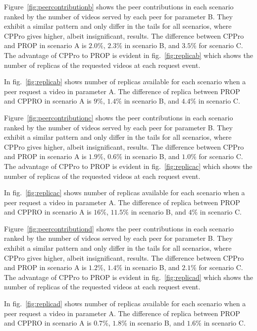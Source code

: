 \documentclass[10pt,final,journal,a4paper]{IEEEtran}
\begin{document}
Figure~\ref{fig:peercontributionb} shows the peer contributions in each scenario ranked by the number of videos served by each peer for parameter B.
They exhibit a similar pattern and only differ in the tails for all scenarios, where CPPro gives higher, albeit insignificant, results.
The difference between CPPro and PROP in scenario A is $2.0\%$, $2.3\%$ in scenario B, and $3.5\%$ for scenario C.
The advantage of CPPro to PROP is evident in fig.~\ref{fig:replicab} which shows the number of replicas of the requested videos at each request event.

In fig.~\ref{fig:replicab} shows number of replicas available for each scenario when a peer request a video in parameter A.
The difference of replica between PROP and CPPRO in scenario A is $9\%$, $1.4\%$ in scenario B, and $4.4\%$ in scenario C.

Figure~\ref{fig:peercontributionc} shows the peer contributions in each scenario ranked by the number of videos served by each peer for parameter B.
They exhibit a similar pattern and only differ in the tails for all scenarios, where CPPro gives higher, albeit insignificant, results.
The difference between CPPro and PROP in scenario A is $1.9\%$, $0.6\%$ in scenario B, and $1.0\%$ for scenario C.
The advantage of CPPro to PROP is evident in fig.~\ref{fig:replicac} which shows the number of replicas of the requested videos at each request event.

In fig.~\ref{fig:replicac} shows number of replicas available for each scenario when a peer request a video in parameter A.
The difference of replica between PROP and CPPRO in scenario A is $16\%$, $11.5\%$ in scenario B, and $4\%$ in scenario C.


Figure~\ref{fig:peercontributiond} shows the peer contributions in each scenario ranked by the number of videos served by each peer for parameter B.
They exhibit a similar pattern and only differ in the tails for all scenarios, where CPPro gives higher, albeit insignificant, results.
The difference between CPPro and PROP in scenario A is $1.2\%$, $1.4\%$ in scenario B, and $2.1\%$ for scenario C.
The advantage of CPPro to PROP is evident in fig.~\ref{fig:replicad} which shows the number of replicas of the requested videos at each request event.

In fig.~\ref{fig:replicad} shows number of replicas available for each scenario when a peer request a video in parameter A.
The difference of replica between PROP and CPPRO in scenario A is $0.7\%$, $1.8\%$ in scenario B, and $1.6\%$ in scenario C.
\end{document}
